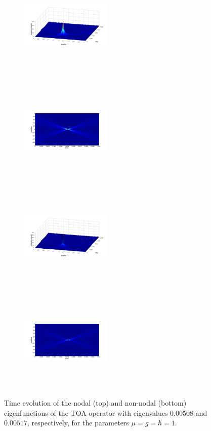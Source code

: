 \documentclass[%
 reprint,
 amsmath,amssymb,
 aps,
]{revtex4-1}
\begin{document}
\begin{figure}[t]
\begin{subfigure}
\centering
\includegraphics[width=0.475\textwidth,height=5cm]{nnondalevo_v64.pdf}
\end{subfigure}
\begin{subfigure}
\centering
\includegraphics[width=0.475\textwidth,height=5cm]{nnondalevo_v64top.pdf}
\end{subfigure}
\begin{subfigure}
\centering
\includegraphics[width=0.475\textwidth,height=5cm]{nondalevo_v63.pdf}
\end{subfigure}
\begin{subfigure}
\centering
\includegraphics[width=0.475\textwidth,height=5cm]{nondalevo_v63top.pdf}
\end{subfigure}
\caption{Time evolution of the nodal (top) and non-nodal (bottom) eigenfunctions of the TOA operator with eigenvalues $0.00508$ and $0.00517$, respectively, for the parameters $\mu=g=\hbar=1$.}
\label{fig:toaeigenfuncevo}
\end{figure}
\end{document}
